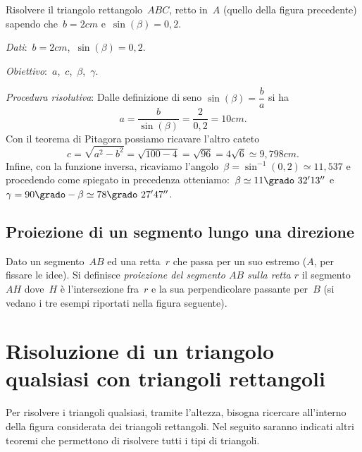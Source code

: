 \begin{exrig}
 \begin{esempio}
Risolvere il triangolo rettangolo~$ABC$, retto in~$A$ (quello della figura precedente) sapendo che~$b=2\unit{cm}$ e~$\sin(\beta)=0,2$.

\emph{Dati}:~$b=2\unit{cm}$,\quad~$\sin(\beta)=0,2$.

\emph{Obiettivo}:~$a$,\quad~$c$,\quad~${\beta}$,\quad~${\gamma}$.

\emph{Procedura risolutiva}:
Dalle definizione di seno $\sin(\beta)=\dfrac{b}{a}$ si ha
\[a=\frac{b}{\sin(\beta)}=\frac{2}{0,2}=10\unit{cm}.\]
Con il teorema di Pitagora possiamo ricavare l'altro cateto
\[c=\sqrt{a^{2}-b^{2}}=\sqrt{100-4}=\sqrt{96}=4\sqrt{6}\simeq 9,798\unit{cm}.\]
Infine, con la funzione inversa, ricaviamo l'angolo~${\beta}=\sin^{-1}(0,2)\simeq 11,537$ e procedendo come spiegato in
precedenza otteniamo:~${\beta}\simeq 11\grado~32' 13''$ e~${\gamma}=90\grado-\beta\simeq 78\grado~27'47''$.
 \end{esempio}
\end{exrig}

\ovalbox{\risolvii \ref{ese:G.7}, \ref{ese:G.8}, \ref{ese:G.9}, \ref{ese:G.10}}

\subsection{Proiezione di un segmento lungo una direzione}

\begin{definizione}
Dato un segmento~$AB$ ed una retta~$r$ che passa per un suo estremo ($A$, per fissare le idee). Si definisce
\emph{proiezione del segmento $AB$ sulla retta $r$} il segmento~$AH$ dove~$H$ è l'intersezione fra~$r$ e la
sua perpendicolare passante per~$B$ (si vedano i tre esempi riportati nella figura seguente).
\end{definizione}

\begin{center}
 
\end{center}

\ovalbox{\risolvii \ref{ese:G.11}, \ref{ese:G.12}, \ref{ese:G.13}, \ref{ese:G.14}, \ref{ese:G.15}, \ref{ese:G.16}, \ref{ese:G.17}, \ref{ese:G.18},
\ref{ese:G.19}, \ref{ese:G.20}, \ref{ese:G.21}}

\section{Risoluzione di un triangolo qualsiasi con triangoli rettangoli}
Per risolvere i triangoli qualsiasi, tramite l'altezza, bisogna ricercare all'interno della figura considerata dei triangoli rettangoli.
Nel seguito saranno indicati altri teoremi che permettono
di risolvere tutti i tipi di triangoli.

